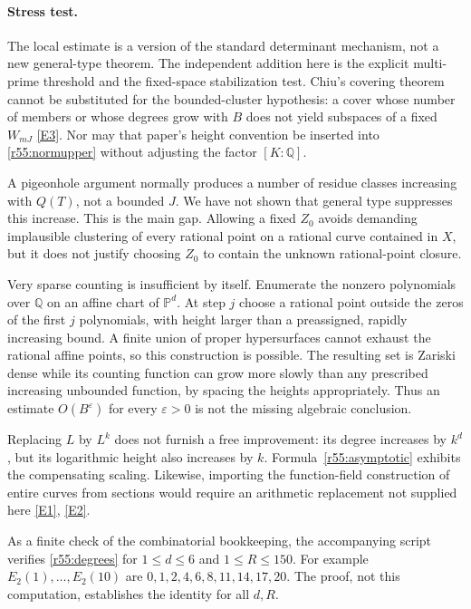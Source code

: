\documentclass[11pt,a4paper]{article}
\newcommand{\Q}{\mathbb{Q}}
\newcommand{\eref}[2]{\hyperlink{extra:#1:#2}{[E#2]}}
\numberwithin{equation}{section}
\begin{document}
\paragraph{Stress test.}
The local estimate is a version of the standard determinant mechanism, not a new general-type theorem. The independent addition here is the explicit multi-prime threshold and the fixed-space stabilization test. Chiu's covering theorem cannot be substituted for the bounded-cluster hypothesis: a cover whose number of members or whose degrees grow with $B$ does not yield subspaces of a fixed $W_{mJ}$ \eref{55}{3}. Nor may that paper's height convention be inserted into \eqref{r55:normupper} without adjusting the factor $[K:\Q]$.

A pigeonhole argument normally produces a number of residue classes increasing with $Q(T)$, not a bounded $J$. We have not shown that general type suppresses this increase. This is the main gap. Allowing a fixed $Z_0$ avoids demanding implausible clustering of every rational point on a rational curve contained in $X$, but it does not justify choosing $Z_0$ to contain the unknown rational-point closure.

Very sparse counting is insufficient by itself. Enumerate the nonzero polynomials over $\Q$ on an affine chart of $\mathbb P^d$. At step $j$ choose a rational point outside the zeros of the first $j$ polynomials, with height larger than a preassigned, rapidly increasing bound. A finite union of proper hypersurfaces cannot exhaust the rational affine points, so this construction is possible. The resulting set is Zariski dense while its counting function can grow more slowly than any prescribed increasing unbounded function, by spacing the heights appropriately. Thus an estimate $O(B^\varepsilon)$ for every $\varepsilon>0$ is not the missing algebraic conclusion.

Replacing $L$ by $L^k$ does not furnish a free improvement: its degree increases by $k^d$, but its logarithmic height also increases by $k$. Formula~\eqref{r55:asymptotic} exhibits the compensating scaling. Likewise, importing the function-field construction of entire curves from sections would require an arithmetic replacement not supplied here \eref{55}{1}, \eref{55}{2}.

As a finite check of the combinatorial bookkeeping, the accompanying script verifies \eqref{r55:degrees} for $1\leq d\leq6$ and $1\leq R\leq150$. For example $E_2(1),\ldots,E_2(10)$ are $0,1,2,4,6,8,11,14,17,20$. The proof, not this computation, establishes the identity for all $d,R$.
\end{document}
